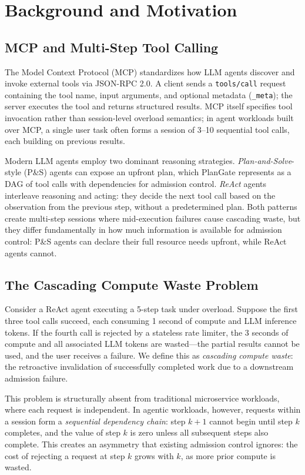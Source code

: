 \documentclass[sigconf,review,anonymous]{acmart}
\begin{document}
\section{Background and Motivation}


\subsection{MCP and Multi-Step Tool Calling}

The Model Context Protocol (MCP) standardizes how LLM agents discover and invoke external tools via JSON-RPC 2.0. A client sends a \texttt{tools/call} request containing the tool name, input arguments, and optional metadata (\texttt{\_meta}); the server executes the tool and returns structured results. MCP itself specifies tool invocation rather than session-level overload semantics; in agent workloads built over MCP, a single user task often forms a session of 3--10 sequential tool calls, each building on previous results.


Modern LLM agents employ two dominant reasoning strategies. \emph{Plan-and-Solve}-style (P\&S) agents can expose an upfront plan, which PlanGate represents as a DAG of tool calls with dependencies for admission control. \emph{ReAct} agents interleave reasoning and acting: they decide the next tool call based on the observation from the previous step, without a predetermined plan. Both patterns create multi-step sessions where mid-execution failures cause cascading waste, but they differ fundamentally in how much information is available for admission control: P\&S agents can declare their full resource needs upfront, while ReAct agents cannot.


\subsection{The Cascading Compute Waste Problem}

Consider a ReAct agent executing a 5-step task under overload. Suppose the first three tool calls succeed, each consuming 1 second of compute and LLM inference tokens. If the fourth call is rejected by a stateless rate limiter, the 3 seconds of compute and all associated LLM tokens are wasted---the partial results cannot be used, and the user receives a failure. We define this as \emph{cascading compute waste}: the retroactive invalidation of successfully completed work due to a downstream admission failure.


This problem is structurally absent from traditional microservice workloads, where each request is independent. In agentic workloads, however, requests within a session form a \emph{sequential dependency chain}: step $k+1$ cannot begin until step $k$ completes, and the value of step $k$ is zero unless all subsequent steps also complete. This creates an asymmetry that existing admission control ignores: the cost of rejecting a request at step $k$ grows with $k$, as more prior compute is wasted.
\end{document}
